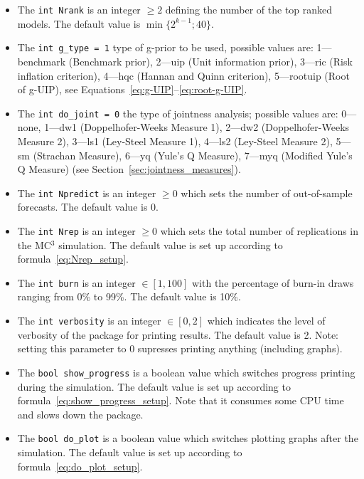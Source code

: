 \begin{itemize}
		is $\alpha=0.6$, but setting $\alpha=1$ results in a model
		consisting of 0 to \textit{k} randomly chosen explanatory variables.
	\item The \lstinline!int Nrank! is an integer $\geq 2$ defining
		the number of the top ranked models. The default value is 
		$\min\{2^{k-1}; 40\}$.
	\item The \lstinline!int g_type = 1! type of g-prior to be used,
		possible values are: 1---benchmark (Benchmark prior),
		2---uip (Unit information prior), 3---ric (Risk inflation
		criterion), 4---hqc (Hannan and Quinn criterion),
		5---rootuip (Root of g-UIP),
		see Equations~\ref{eq:g-UIP}--\ref{eq:root-g-UIP}.
	\item The \lstinline!int do_joint = 0! the type of
		jointness analysis; possible values are: 0---none,
		1---dw1 (Doppelhofer-Weeks Measure 1),
		2---dw2 (Doppelhofer-Weeks Measure 2),
		3---ls1 (Ley-Steel Measure 1), 4---ls2 (Ley-Steel Measure 2),
		5---sm (Strachan Measure), 6---yq (Yule's Q Measure),
		7---myq (Modified Yule's Q Measure)
		(see Section~\ref{sec:jointness_measures}).
	\item The \lstinline!int Npredict! is an integer $\geq 0$
		which sets the number of out-of-sample forecasts.
		The default value is 0.
	\item The \lstinline!int Nrep! is an integer $\geq 0$ which
		sets the total number of replications in the MC$^3$ simulation.
		The default value is set up according to formula~\eqref{eq:Nrep_setup}.
	\item The \lstinline!int burn! is an integer $\in [1,100]$ with
		the percentage of burn-in draws	ranging from 0\% to 99\%.
		The default value is 10\%.
	\item The \lstinline!int verbosity! is an integer $\in [0,2]$
		which indicates the level of verbosity of the  package
		for printing results. The default value is 2.
		Note: setting this parameter to 0 supresses printing
		anything (including graphs).
	\item The \lstinline!bool show_progress! is a boolean value 
		which switches progress printing during the simulation.
		The default value is set up according to formula~\eqref{eq:show_progress_setup}.
		Note that it consumes some CPU time and slows down the package.
	\item The \lstinline!bool do_plot! is a boolean value which
		switches plotting graphs after the simulation.
		The default value is set up according to formula~\eqref{eq:do_plot_setup}.
\end{itemize}


